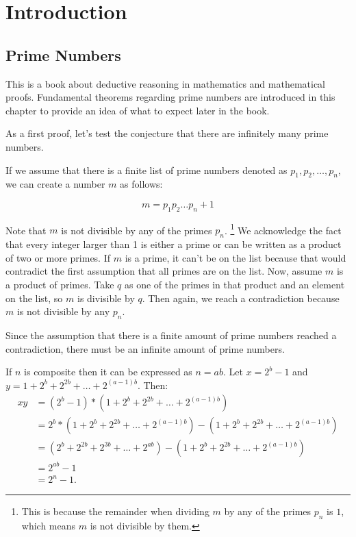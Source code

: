 \chapter{Introduction}

\section{Prime Numbers}
This is a book about deductive reasoning in mathematics and mathematical proofs. 
Fundamental theorems regarding prime numbers are introduced in this chapter to provide an idea of what to expect later in the book.


As a first proof, let's test the conjecture that there are infinitely many prime numbers.

\begin{myproof}
If we assume that there is a finite list of prime numbers denoted as $p_1, p_2, \ldots, p_n$, we can create a number $m$ as follows:

\[
m = p_1p_2 \ldots p_n + 1
\]

Note that $m$ is not divisible by any of the primes $p_n$.
\footnote{This is because the remainder when dividing $m$ by any of the primes $p_n$ is $1$, 
which means $m$ is not divisible by them.}
We acknowledge the fact that every integer larger than 1 is either a prime or can be written as a product of two or more primes. 
If $m$ is a prime, it can't be on the list because that would contradict the first assumption that all primes are on the list. 
Now, assume $m$ is a product of primes. 
Take $q$ as one of the primes in that product and an element on the list, so $m$ is divisible by $q$. 
Then again, we reach a contradiction because $m$ is not divisible by any $p_n$.

Since the assumption that there is a finite amount of prime numbers reached a contradiction, there must be an infinite amount of prime numbers.
\end{myproof}

\begin{myproof}
  If $n$ is composite then it can be expressed as  $n = ab$. 
  Let  $x = 2^b -1$ and  $y = 1 + 2^b + 2^{2b} + \ldots + 2^{(a-1)b}$.
  Then:
\begin{align*}
  xy &= (2^b - 1)*(1 + 2^b + 2^{2b} + \ldots + 2^{(a-1)b})\\
     &= 2^b * (1 + 2^b + 2^{2b} + \ldots + 2^{(a-1)b}) -  (1 + 2^b + 2^{2b} + \ldots + 2^{(a-1)b})\\
     &= (2^b + 2^{2b} + 2^{3b} + \ldots + 2^{ab}) -  (1 + 2^b + 2^{2b} + \ldots + 2^{(a-1)b})\\
     &= 2^{ab} - 1\\
     &= 2^n - 1.  
\end{align*}
\end{myproof}

